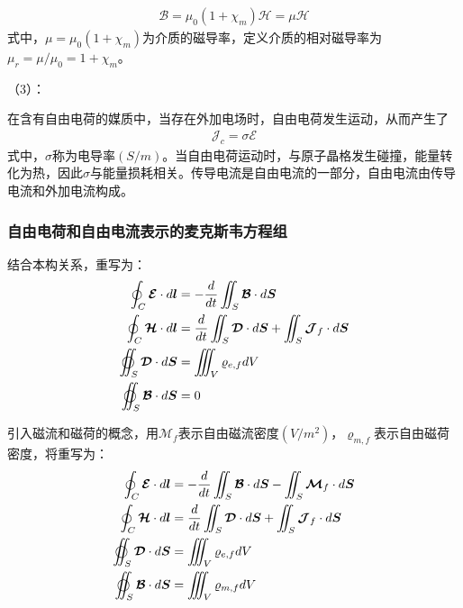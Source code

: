 \documentclass{article}
\numberwithin{equation}{section}
\renewcommand{\vec}[1]{\boldsymbol{#1}}
\begin{document}
\begin{align}
    \vec{\mathcal{B}}=\mu_0 (1+\chi_m) \vec{\mathcal{H}}=\mu \vec{\mathcal{H}}
\end{align}
式中，$\mu=\mu_0 (1+\chi_m)$为介质的磁导率，定义介质的相对磁导率为$\mu_r=\mu / \mu_0 =1+\chi_m$。\par
（3）\textbf{\color{blue}{电传导}}：\par
在含有自由电荷的媒质中，当存在外加电场时，自由电荷发生运动，从而产生了\textbf{\color{blue}{传导电流}}
\begin{align}
    \vec{\mathcal{J}}_c=\sigma \vec{\mathcal{E}}
\end{align}
式中，$\sigma$称为电导率$(S/m)$。当自由电荷运动时，与原子晶格发生碰撞，能量转化为热，因此$\sigma$与能量损耗相关。传导电流是自由电流的一部分，自由电流由传导电流和外加电流构成。
\subsubsection{自由电荷和自由电流表示的麦克斯韦方程组}
结合本构关系，\textbf{\color{blue}{麦克斯韦方程组的积分形式}}重写为：
\begin{align}
    \label{eq:eq14}
    \oint_C \vec{\mathcal{E}} \cdot d\vec{l}&=-\frac{d}{dt}\iint_S \vec{\mathcal{B}}\cdot d\vec{S} \\
    \label{eq:eq15}
    \oint_C \vec{\mathcal{H}} \cdot d\vec{l}&=\frac{d}{dt}\iint_S \vec{\mathcal{D}} \cdot d\vec{S}+\iint _S \vec{\mathcal{J}}_f\cdot d\vec{S} \\
    \label{eq:eq16}
    \varoiint_S \vec{\mathcal{D}} \cdot d\vec{S}&=\iiint_V \varrho _{e,f}dV \\
    \label{eq:eq17}
    \varoiint_S \vec{\mathcal{B}} \cdot d\vec{S}&=0
\end{align}
\par
引入磁流和磁荷的概念，用$\vec{\mathcal{M}}_f$表示自由磁流密度$(V/m^2)$，$\varrho _{m,f}$表示自由磁荷密度，将\textbf{\color{blue}{麦克斯韦方程组的积分形式}}重写为：
\begin{align}
    \label{eq:eq18}
    \oint_C \vec{\mathcal{E}} \cdot d\vec{l}&=-\frac{d}{dt}\iint_S \vec{\mathcal{B}}\cdot d\vec{S}- \iint _S \vec{\mathcal{M}}_f\cdot d\vec{S}\\
    \label{eq:eq19}
    \oint_C \vec{\mathcal{H}} \cdot d\vec{l}&=\frac{d}{dt}\iint_S \vec{\mathcal{D}} \cdot d\vec{S}+\iint _S \vec{\mathcal{J}}_f\cdot d\vec{S} \\
    \label{eq:eq20}
    \varoiint_S \vec{\mathcal{D}} \cdot d\vec{S}&=\iiint_V \varrho _{e,f}dV \\
    \label{eq:eq21}
    \varoiint_S \vec{\mathcal{B}} \cdot d\vec{S}&=\iiint_V \varrho _{m,f}dV
\end{align}
\end{document}
